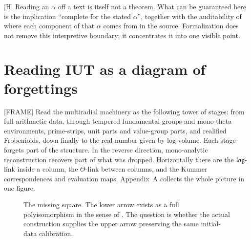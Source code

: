 \documentclass[11pt]{article}
\theoremstyle{plain}
\theoremstyle{definition}
\theoremstyle{remark}
\newcommand{\FRAME}{\textup{[FRAME]}}
\newcommand{\Hmark}{\textup{[H]}}
\begin{document}
\Hmark{} Reading an $\alpha$ off a text is itself not a theorem.
What can be guaranteed here is the implication ``complete for the
stated $\alpha$'', together with the auditability of where each
component of that $\alpha$ comes from in the source.  Formalization
does not remove this interpretive boundary; it concentrates it into
one visible point.

\section{Reading IUT as a diagram of forgettings}

\FRAME{} Read the multiradial machinery as the following tower of
stages: from full arithmetic data, through tempered fundamental
groups and mono-theta environments, prime-strips, unit parts and
value-group parts, and realified Frobenioids, down finally to the
real number given by log-volume.  Each stage forgets part of the
structure.  In the reverse direction, mono-analytic reconstruction
recovers part of what was dropped.  Horizontally there are the
$\mathfrak{log}$-link inside a column, the $\Theta$-link between
columns, and the Kummer correspondences and evaluation maps.
Appendix~A collects the whole picture in one figure.

\begin{figure}[h]
\centering
{}
\caption{The missing square.  The lower arrow exists as a full
polyisomorphism in the sense of \cite[Def.~3.8(ii)]{IUT3}.  The
question is whether the actual construction supplies the upper
arrow preserving the same initial-data calibration.}
\label{fig:square}
\end{figure}
\end{document}
